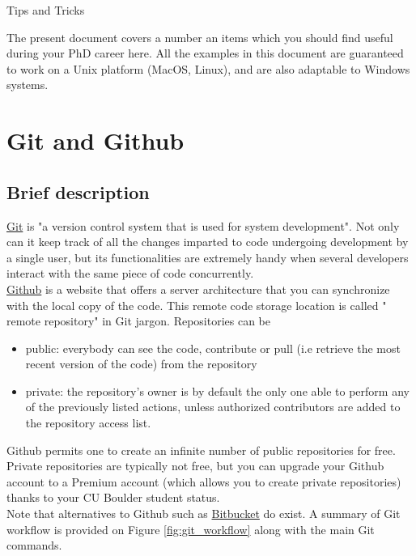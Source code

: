 \documentclass{report}
\makeatletter
\newcommand*{\toccontents}{\@starttoc{toc}}
\makeatother
\begin{document}
\begin{huge}
\begin{center}
Tips and Tricks
\end{center}
\end{huge}
The present document covers a number an items which you should find useful during your PhD career here. All the examples in this document are guaranteed to work on a Unix platform (MacOS, Linux), and are also adaptable to Windows systems.\\
\toccontents
\section{Git and Github}
\subsection{Brief description}
\href{https://en.wikipedia.org/wiki/Git_(software)}{Git} is "a version control system that is used for system development". Not only can it keep track of all the changes imparted to code undergoing development by a single user, but its functionalities are extremely handy when several developers interact with the same piece of code concurrently.\\
\href{https://github.com/}{Github} is a website that offers a server architecture that you can synchronize with the local copy of the code. This remote code storage location is called " remote repository" in Git jargon. Repositories can be
\begin{itemize}
\item public: everybody can see the code, contribute or pull (i.e retrieve the most recent version of the code) from the repository
\item private: the repository's owner is by default the only one able to perform any of the previously listed actions, unless authorized contributors are added to the repository access list.
\end{itemize} 
Github permits one to create an infinite number of public repositories for free. Private repositories are typically not free, but you can upgrade your Github account to a Premium account (which allows you to create private repositories) thanks to your CU Boulder student status.\\ Note that alternatives to Github such as \href{https://bitbucket.org}{Bitbucket}  do exist.
A summary of Git workflow is provided on Figure \ref{fig:git_workflow} along with the main Git commands.
\end{document}
